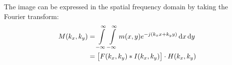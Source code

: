 \documentclass[11pt]{article}
\begin{document}
The image can be expressed in the spatial frequency domain by taking the Fourier transform:
%
\begin{equation}
  \begin{split}
    M(k_x, k_y) &= \int \limits_{-\infty}^{\infty} \int \limits_{-\infty}^{\infty}   m(x,y) e^{-j(k_x x + k_y y)} \mathop{}\!\mathrm{d}{x}\mathop{}\!\mathrm{d}{y} \\
    &=  \left[ F(k_x,k_y) \ast I(k_x,k_y) \right] \cdot H(k_x,k_y)
  \end{split}
  \label{eq:FT}
\end{equation}
%







\clearpage %


\end{document}

